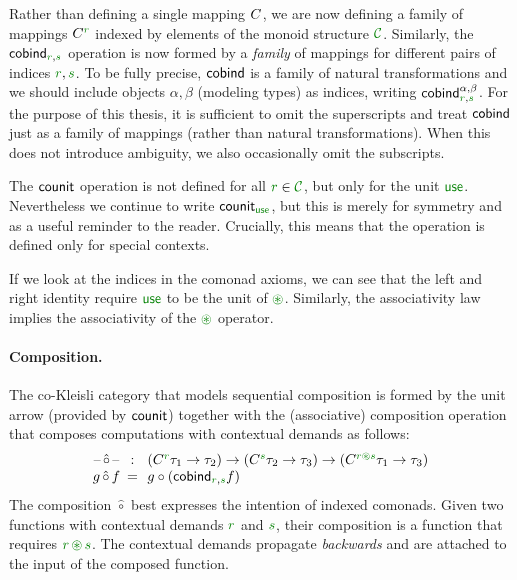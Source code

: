 \noindent
Rather than defining a single mapping $C^{}$, we are now defining a family of mappings
$\ctyp{\cclrd{r}}{}$ indexed by elements of the monoid structure $\C$. Similarly, the $\ident{cobind}_{\cclrd{r}, \cclrd{s}}$
operation is now formed by a \emph{family} of mappings for different pairs of indices
$\cclrd{r}, \cclrd{s}$. To be fully precise, $\textnormal{\sffamily cobind}$ is a family of natural transformations
and we should include objects $\alpha, \beta$ (modeling types) as indices, writing $\ident{cobind}_{\cclrd{r},\cclrd{s}}^{\alpha, \beta}$.
For the purpose of this thesis, it is sufficient to omit the superscripts and treat $\textnormal{\sffamily cobind}$ just
as a family of mappings (rather than natural transformations). When this does not introduce ambiguity,
we also occasionally omit the subscripts.

The $\textnormal{\sffamily counit}$ operation is not defined for all $\cclrd{r} \in \C$, but only for
the unit $\cunit$. Nevertheless we continue to write $\ident{counit}_{\cunit}$,
but this is merely for symmetry and as a useful reminder to the reader. Crucially, this means that
the operation is defined only for special contexts.

If we look at the indices in the comonad axioms, we can see that the left and right identity
require $\cunit$ to be the unit of $\cseq$. Similarly, the associativity law implies the
associativity of the $\cseq$ operator.

\paragraph{Composition.}
The co-Kleisli category that models sequential composition is formed by the unit arrow (provided
by $\textnormal{\sffamily counit}$) together with the (associative) composition operation that composes computations
with contextual demands as follows:
%
\begin{equation*}
\begin{array}{ccl}
\textnormal{--}\, \hat{\circ} \,\textnormal{--}&\narrow{:}& (\ctyp{\cclrd{r}}{\tau_1} \rightarrow \tau_2)
  \rightarrow (\ctyp{\cclrd{s}}{\tau_2} \rightarrow \tau_3)
  \rightarrow (\ctyp{\cclrd{r} \cseq \cclrd{s}}{\tau_1} \rightarrow \tau_3) \\
g \, \hat{\circ} \, f &\narrow{=}& g \circ (\ident{cobind}_{\cclrd{r}, \cclrd{s}} f)
\end{array}
\end{equation*}
%
The composition $\hat{\circ}$ best expresses the intention of indexed comonads. Given two functions
with contextual demands $\cclrd{r}$ and $\cclrd{s}$, their composition is a function that
requires $\cclrd{r}\,\cseq\,\cclrd{s}$. The contextual demands propagate \emph{backwards} and
are attached to the input of the composed function.

